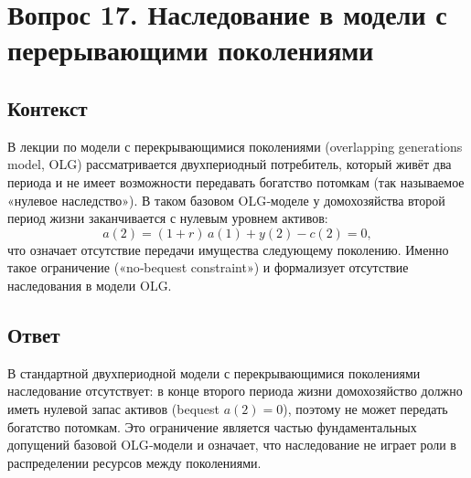 \section*{Вопрос 17. Наследование в модели с перерывающими поколениями}

\subsection*{Контекст}
В лекции по модели с перекрывающимися поколениями (overlapping generations model, OLG) рассматривается 
двухпериодный потребитель, который живёт два периода и не имеет возможности передавать богатство потомкам 
(так называемое «нулевое наследство»). В таком базовом OLG‑моделе у домохозяйства второй период жизни заканчивается с 
нулевым уровнем активов: 
\[
a(2)=(1+r)\,a(1)+y(2)-c(2)=0,
\]
что означает отсутствие передачи имущества следующему поколению. Именно такое ограничение («no‑bequest constraint») и
 формализует отсутствие наследования в модели OLG.

\subsection*{Ответ}

В стандартной двухпериодной модели с перекрывающимися поколениями наследование отсутствует: 
в конце второго периода жизни домохозяйство должно иметь нулевой запас активов (bequest \(a(2)=0\)), 
поэтому не может передать богатство потомкам. Это ограничение является частью фундаментальных допущений базовой
 OLG‑модели и означает, что наследование не играет роли в распределении ресурсов между поколениями. 
